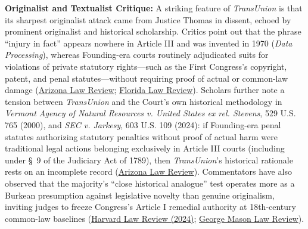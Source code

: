 \documentclass[12pt]{article}
\begin{document}
\textbf{Originalist and Textualist Critique:} A striking feature of \textit{TransUnion} is that its sharpest originalist attack came from Justice Thomas in dissent, echoed by prominent originalist and historical scholarship. Critics point out that the phrase ``injury in fact'' appears nowhere in Article III and was invented in 1970 (\textit{Data Processing}), whereas Founding-era courts routinely adjudicated suits for violations of private statutory rights---such as the First Congress's copyright, patent, and penal statutes---without requiring proof of actual or common-law damage (\href{https://journals.librarypublishing.arizona.edu/arizlrev/article/10580/galley/9221/download/}{Arizona Law Review}; \href{https://scholarship.law.ufl.edu/cgi/viewcontent.cgi?article=4189&context=flr}{Florida Law Review}). Scholars further note a tension between \textit{TransUnion} and the Court's own historical methodology in \textit{Vermont Agency of Natural Resources v. United States ex rel. Stevens}, 529 U.S. 765 (2000), and \textit{SEC v. Jarkesy}, 603 U.S. 109 (2024): if Founding-era penal statutes authorizing statutory penalties without proof of actual harm were traditional legal actions belonging exclusively in Article III courts (including under \S~9 of the Judiciary Act of 1789), then \textit{TransUnion}'s historical rationale rests on an incomplete record (\href{https://journals.librarypublishing.arizona.edu/arizlrev/article/10580/galley/9221/download/}{Arizona Law Review}). Commentators have also observed that the majority's ``close historical analogue'' test operates more as a Burkean presumption against legislative novelty than genuine originalism, inviting judges to freeze Congress's Article I remedial authority at 18th-century common-law baselines (\href{https://harvardlawreview.org/print/vol-137/the-presumption-against-novelty-in-the-roberts-courts-separation-of-powers-case-law/}{Harvard Law Review (2024)}; \href{https://lawreview.gmu.edu/print__issues/the-court-continues-to-confuse-standing-the-pitfalls-of-faux-article-iii-originalism/}{George Mason Law Review}).
\end{document}

